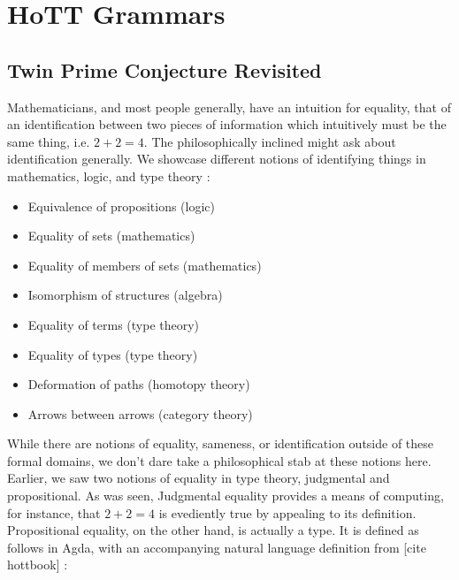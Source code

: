 \section{HoTT Grammars} \label{hottgram}

\subsection{Twin Prime Conjecture Revisited} \label{twins}


Mathematicians, and most people generally, have an intuition
for equality, that of an identification between two pieces of information
which intuitively must be the same thing, i.e. $2+2=4$. The philosophically
inclined might ask about identification generally. We showcase different
notions of identifying things in mathematics, logic, and type theory :

\begin{itemize}
\item Equivalence of propositions (logic)
\item Equality of sets (mathematics)
\item Equality of members of sets (mathematics)
\item Isomorphism of structures (algebra)
\item Equality of terms (type theory)
\item Equality of types (type theory)
\item Deformation of paths (homotopy theory)
\item Arrows between arrows (category theory)
\end{itemize}

While there are notions of equality, sameness, or identification outside of
these formal domains, we don't dare take a philosophical stab at these notions
here. Earlier, we saw two notions of equality in type theory, judgmental and
propositional. As was seen, Judgmental equality provides a means of computing,
for instance, that $2+2=4$ is evediently true by appealing to its definition.
Propositional equality, on the other hand, is actually a type. It is defined as
follows in Agda, with an accompanying natural language definition from [cite
hottbook] :

